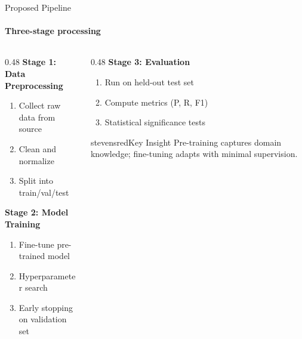 \begin{frame}{Proposed Pipeline}
\framesubtitle{Three-stage processing}

\begin{columns}
\begin{column}{0.48\textwidth}
\textbf{Stage 1: Data Preprocessing}
\begin{enumerate}
    \item Collect raw data from source
    \item Clean and normalize
    \item Split into train/val/test
\end{enumerate}

\vspace{0.5em}
\textbf{Stage 2: Model Training}
\begin{enumerate}
    \item Fine-tune pre-trained model
    \item Hyperparameter search
    \item Early stopping on validation set
\end{enumerate}
\end{column}
\begin{column}{0.48\textwidth}
\textbf{Stage 3: Evaluation}
\begin{enumerate}
    \item Run on held-out test set
    \item Compute metrics (P, R, F1)
    \item Statistical significance tests
\end{enumerate}

\vspace{0.5em}

\begin{colorblock}[white]{stevensred}{Key Insight}
Pre-training captures domain knowledge; fine-tuning adapts with minimal supervision.
\end{colorblock}

\end{column}
\end{columns}
\end{frame}

